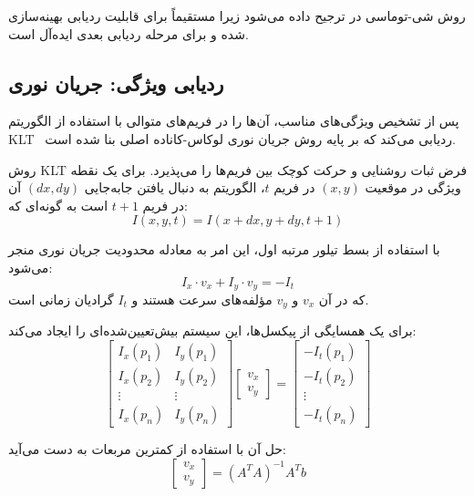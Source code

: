 \documentclass[11pt, a4paper]{article}
\begin{document}
	روش شی-توماسی در 
	ترجیح داده می‌شود زیرا مستقیماً برای قابلیت ردیابی بهینه‌سازی شده و برای مرحله ردیابی بعدی ایده‌آل است.
	
	\subsection{ردیابی ویژگی: جریان نوری }
	\label{kltsection}
	پس از تشخیص ویژگی‌های مناسب،
	 آن‌ها را در فریم‌های متوالی با استفاده از الگوریتم  \gls{KLT} \ ردیابی می‌کند که بر پایه روش جریان نوری لوکاس-کاناده اصلی \cite{lucas1981iterative} بنا شده است.
	
	روش \gls{KLT} فرض ثبات روشنایی و حرکت کوچک بین فریم‌ها را می‌پذیرد. برای یک نقطه ویژگی در موقعیت $(x,y)$ در فریم $t$، الگوریتم به دنبال یافتن جابه‌جایی $(dx, dy)$ آن در فریم $t+1$ است به گونه‌ای که:
	\begin{equation*}
		I(x,y,t) = I(x+dx, y+dy, t+1)
	\end{equation*}
	
	با استفاده از بسط تیلور مرتبه اول، این امر به معادله محدودیت جریان نوری منجر می‌شود:
	\begin{equation}
		I_x \cdot v_x + I_y \cdot v_y = -I_t
	\end{equation}
	که در آن $v_x$ و $v_y$ مؤلفه‌های سرعت هستند و $I_t$ گرادیان زمانی است.
	
	برای یک همسایگی از پیکسل‌ها، این سیستم بیش‌تعیین‌شده‌ای را ایجاد می‌کند:
	\begin{equation}
		\begin{bmatrix}
			I_x(p_1) & I_y(p_1) \\
			I_x(p_2) & I_y(p_2) \\
			\vdots & \vdots \\
			I_x(p_n) & I_y(p_n)
		\end{bmatrix}
		\begin{bmatrix}
			v_x \\
			v_y
		\end{bmatrix}
		=
		\begin{bmatrix}
			-I_t(p_1) \\
			-I_t(p_2) \\
			\vdots \\
			-I_t(p_n)
		\end{bmatrix}
	\end{equation}
	
	حل آن با استفاده از کمترین مربعات به دست می‌آید:
	\begin{equation}
		\begin{bmatrix}
			v_x \\
			v_y
		\end{bmatrix}
		= (A^T A)^{-1} A^T b
	\end{equation}
	
\end{document}
